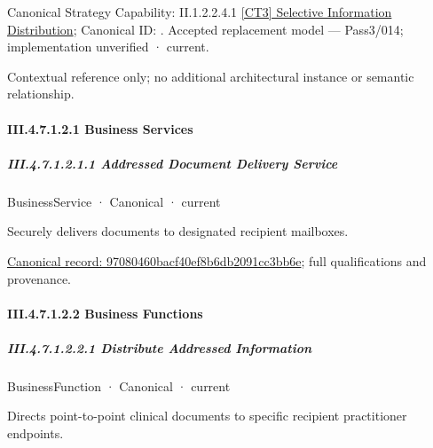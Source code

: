 {\small Canonical Strategy Capability: II.1.2.2.4.1 \hyperref[element:87869a1eec5f4c7cb87600a06cc8fd6e]{[CT3] Selective Information Distribution}; Canonical ID: \texttt{}. Accepted replacement model — Pass3/014; implementation unverified · current.}\par
Contextual reference only; no additional architectural instance or semantic relationship.\par
\paragraph*{III.4.7.1.2.1 Business Services}
\label{navigation:III.4.7.1.2.1}

\subparagraph*{III.4.7.1.2.1.1 Addressed Document Delivery Service}
\label{navigation:III.4.7.1.2.1.1}

\label{element:97080460bacf40ef8b6db2091cc3bb6e}
{\small BusinessService · Canonical · current}\par

Securely delivers documents to designated recipient mailboxes.


{\footnotesize \href{../../../../../../../continuum/business/business-service/97080460bacf40ef8b6db2091cc3bb6e.md}{Canonical record: 97080460bacf40ef8b6db2091cc3bb6e}; full qualifications and provenance.}\par
\paragraph*{III.4.7.1.2.2 Business Functions}
\label{navigation:III.4.7.1.2.2}

\subparagraph*{III.4.7.1.2.2.1 Distribute Addressed Information}
\label{navigation:III.4.7.1.2.2.1}

\label{element:6c9090a3d0a74a968475e05eb617e84f}
{\small BusinessFunction · Canonical · current}\par

Directs point-to-point clinical documents to specific recipient practitioner endpoints.


